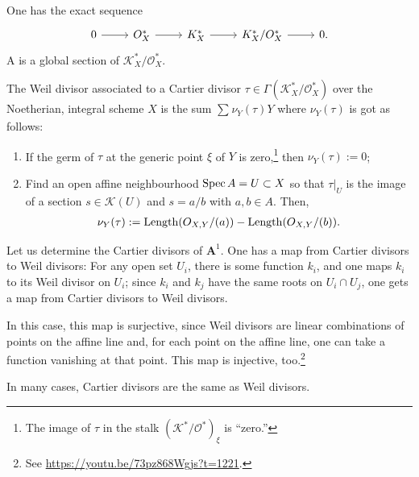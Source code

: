 \documentclass [11 pt, oneside] {article}
\begin{document}
One has the exact sequence
\[
\begin{tikzcd}
	0\ar[r]&\mathscr{O}_X^* \ar[r]&\mathscr{K}_X^*\ar[r]&\mathscr{K}_X^*/\mathscr{O}_X^*\ar[r]&0.
\end{tikzcd}
\]
A  is a global section of $\mathscr{K}^*_X/\mathscr{O}^*_X$.

The Weil divisor associated to a Cartier divisor $\tau \in \Gamma(\mathscr{K}_X^*/\mathscr{O}_X^*)$ over the Noetherian, integral scheme $X$ is the sum $\sum_{ }^{} \nu_Y(\tau)Y$ where $\nu_Y(\tau)$ is got as follows:
\begin{enumerate}
	\item If the germ of $\tau$ at the generic point $\xi$ of $Y$ is zero,\footnote{The image of $\tau$ in the stalk $(\mathscr{K}^*/\mathscr{O}^*)_\xi$ is ``zero.''} then $\nu_Y(\tau):=0$;
	\item Find an open affine neighbourhood $\operatorname{Spec} A = U\subset X$ so that $\tau \big|_U$ is the image of a section $s\in \mathscr{K}(U)$ and $s=a/b$ with $a,b\in A$. Then,
		\begin{align*}
			\nu_Y(\tau) := \operatorname{Length}(\relax{O}_{X,Y}/(a)) - \operatorname{Length}(\relax{O}_{X,Y}/(b)).
		\end{align*}
\end{enumerate}

\begin{example}[ ]\label{}\text{}
Let us determine the Cartier divisors of $\mathbf{A}^1$. One has a map from Cartier divisors to Weil divisors: For any open set $U_i$, there is some function $k_i$, and one maps $k_i$ to its Weil divisor on $U_i$; since $k_i$ and $k_j$ have the same roots on $U_i\cap U_j$, one gets a map from Cartier divisors to Weil divisors. 

In this case, this map is surjective, since Weil divisors are linear combinations of points on the affine line and, for each point on the affine line, one can take a function vanishing at that point. This map is injective, too.\footnote{See \url{https://youtu.be/73pz868Wgjs?t=1221}.}
\end{example}

In many cases, Cartier divisors are the same as Weil divisors.
\end{document}
